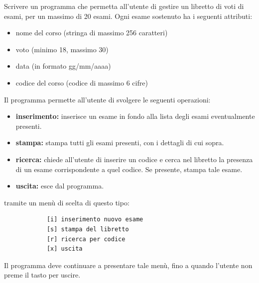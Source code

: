 \begin{Exercise}[label={ex:libretto}]
		Scrivere un programma che permetta all'utente di gestire un libretto di voti di esami, per un massimo di 20 esami. Ogni esame sostenuto ha i seguenti attributi:

		\begin{itemize}
		    \item nome del corso (stringa di massimo 256 caratteri)
		    \item voto (minimo 18, massimo 30)
		    \item data (in formato gg/mm/aaaa)
		    \item codice del corso (codice di massimo 6 cifre)
		\end{itemize}

		Il programma permette all'utente di svolgere le seguenti operazioni:

		\begin{itemize}
		    \item \textbf{inserimento:} inserisce un esame in fondo alla lista degli esami eventualmente presenti.
		    \item \textbf{stampa:} stampa tutti gli esami presenti, con i dettagli di cui sopra.
		    \item \textbf{ricerca:} chiede all'utente di inserire un codice e cerca nel libretto la presenza di un esame corrispondente a quel codice. Se presente, stampa tale esame.
		    \item \textbf{uscita:} esce dal programma.
		\end{itemize}
		tramite un menù di scelta di questo tipo:
		\begin{verbatim}
		    [i] inserimento nuovo esame
		    [s] stampa del libretto
		    [r] ricerca per codice
		    [x] uscita
		\end{verbatim}

		Il programma deve continuare a presentare tale menù, fino a quando l'utente non preme il tasto per uscire.
\end{Exercise}

\begin{Answer}[ref={ex:libretto}]
  	
\end{Answer}
